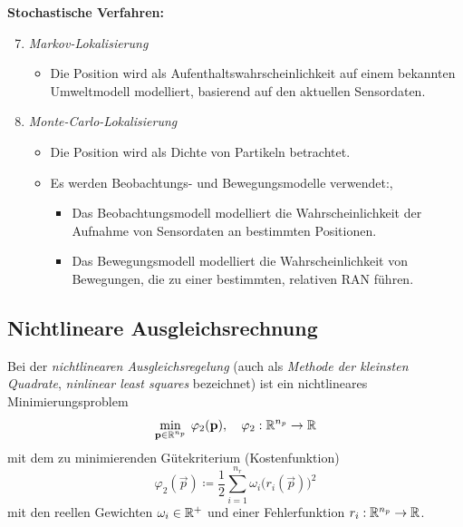 		\textbf{Stochastische Verfahren:}
		\begin{enumerate} \setcounter{enumi}{6}
			\item \emph{Markov-Lokalisierung}
				\begin{itemize}
					\item Die Position wird als Aufenthaltswahrscheinlichkeit auf einem bekannten Umweltmodell modelliert, basierend auf den aktuellen Sensordaten.
				\end{itemize}
			\item \emph{Monte-Carlo-Lokalisierung}
				\begin{itemize}
					\item Die Position wird als Dichte von Partikeln betrachtet.
					\item Es werden Beobachtungs- und Bewegungsmodelle verwendet:, 
						\begin{itemize}
							\item Das Beobachtungsmodell modelliert die Wahrscheinlichkeit der Aufnahme von Sensordaten an bestimmten Positionen.
							\item Das Bewegungsmodell modelliert die Wahrscheinlichkeit von Bewegungen, die zu einer bestimmten, relativen RAN führen.
						\end{itemize}
				\end{itemize}
		\end{enumerate}
	
		\subsection{Nichtlineare Ausgleichsrechnung}
			\label{sec:leastsquares}
		
			Bei der \emph{nichtlinearen Ausgleichsregelung} (auch als \emph{Methode der kleinsten Quadrate}, \emph{ninlinear least squares} bezeichnet) ist ein nichtlineares Minimierungsproblem
			\begin{equation*}
				\min_{\boldsymbol{\mathrm{p}} \in \mathbb{R}^{n_p}} \> \varphi_2(\boldsymbol{\mathrm{p}}),\quad \varphi_2 : \mathbb{R}^{n_p} \to \mathbb{R}
			\end{equation*}
			mit dem zu minimierenden Gütekriterium (Kostenfunktion)
			\begin{equation*}
				\varphi_2(\vec{p}) \coloneqq \frac{1}{2} \sum_{i = 1}^{n_r} \omega_i \big(r_i(\vec{p})\big)^2
			\end{equation*}
			mit den reellen Gewichten \( \omega_i \in \mathbb{R}^+ \) und einer Fehlerfunktion \( r_i : \mathbb{R}^{n_p} \to \mathbb{R} \).
			
